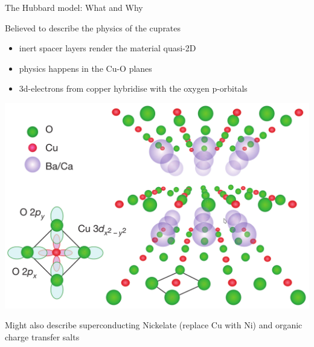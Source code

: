 \documentclass[11pt,aspectratio=169]{beamer}
\begin{document}
\begin{frame}{The Hubbard model: What and Why}

\begin{minipage}{0.59\textwidth}
	\alert{Believed to describe the physics of the cuprates}\\[10pt]

\begin{itemize}
	\item inert spacer layers render the material quasi-2D
	\item physics happens in the Cu-O planes
	\item 3d-electrons from copper hybridise with the oxygen p-orbitals
\end{itemize}
\end{minipage}
\begin{minipage}{0.4\textwidth}
	\includegraphics[width=\textwidth]{cuprates.png}
\end{minipage}

\vspace*{\fill}

Might also describe superconducting Nickelate (replace Cu with Ni) and organic charge transfer salts


\end{frame}
\end{document}
